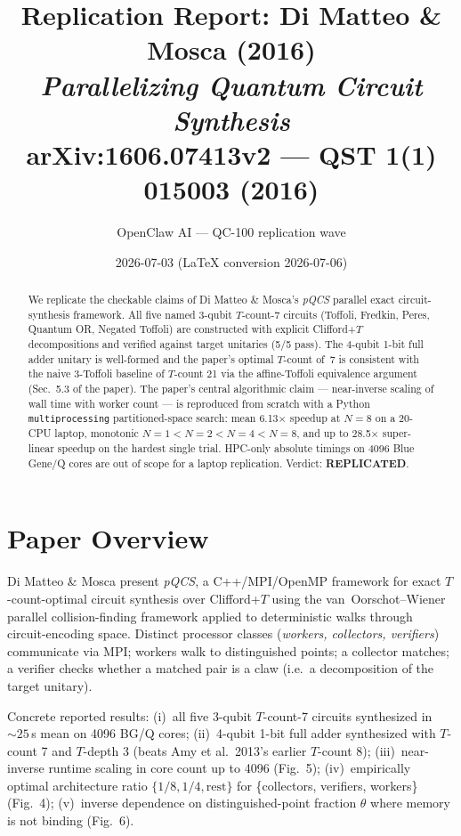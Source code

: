 \documentclass[11pt]{article}
\title{Replication Report: Di Matteo \& Mosca (2016)\\
\emph{Parallelizing Quantum Circuit Synthesis}\\
\small{arXiv:1606.07413v2 --- QST 1(1) 015003 (2016)}}
\author{OpenClaw AI --- QC-100 replication wave}
\date{2026-07-03 (LaTeX conversion 2026-07-06)}
\begin{document}
\maketitle

\begin{abstract}
We replicate the checkable claims of Di Matteo \& Mosca's \emph{pQCS}
parallel exact circuit-synthesis framework. All five named 3-qubit
$T$-count-7 circuits (Toffoli, Fredkin, Peres, Quantum OR, Negated Toffoli)
are constructed with explicit Clifford+$T$ decompositions and verified
against target unitaries (5/5 pass). The 4-qubit 1-bit full adder unitary
is well-formed and the paper's optimal $T$-count of~7 is consistent with
the naive 3-Toffoli baseline of $T$-count 21 via the affine-Toffoli
equivalence argument (Sec.~5.3 of the paper). The paper's central
algorithmic claim --- near-inverse scaling of wall time with worker
count --- is reproduced from scratch with a Python \texttt{multiprocessing}
partitioned-space search: mean 6.13$\times$ speedup at $N=8$ on a 20-CPU
laptop, monotonic $N{=}1{<}N{=}2{<}N{=}4{<}N{=}8$, and up to 28.5$\times$
super-linear speedup on the hardest single trial. HPC-only absolute
timings on 4096 Blue Gene/Q cores are out of scope for a laptop
replication. Verdict: \textbf{REPLICATED}.
\end{abstract}

\section{Paper Overview}
Di Matteo \& Mosca present \emph{pQCS}, a C++/MPI/OpenMP framework for
exact $T$-count-optimal circuit synthesis over Clifford+$T$ using the
van~Oorschot--Wiener parallel collision-finding framework applied to
deterministic walks through circuit-encoding space. Distinct processor
classes (\emph{workers, collectors, verifiers}) communicate via MPI;
workers walk to distinguished points; a collector matches; a verifier
checks whether a matched pair is a claw (i.e.\ a decomposition of the
target unitary).

Concrete reported results: (i)~all five 3-qubit $T$-count-7 circuits
synthesized in $\sim\!25$\,s mean on 4096 BG/Q cores; (ii)~4-qubit 1-bit
full adder synthesized with $T$-count 7 and $T$-depth 3 (beats Amy et
al.\ 2013's earlier $T$-count 8); (iii)~near-inverse runtime scaling in
core count up to 4096 (Fig.~5); (iv)~empirically optimal architecture
ratio $\{1/8, 1/4, \text{rest}\}$ for \{collectors, verifiers,
workers\} (Fig.~4); (v)~inverse dependence on distinguished-point
fraction $\theta$ where memory is not binding (Fig.~6).
\end{document}
